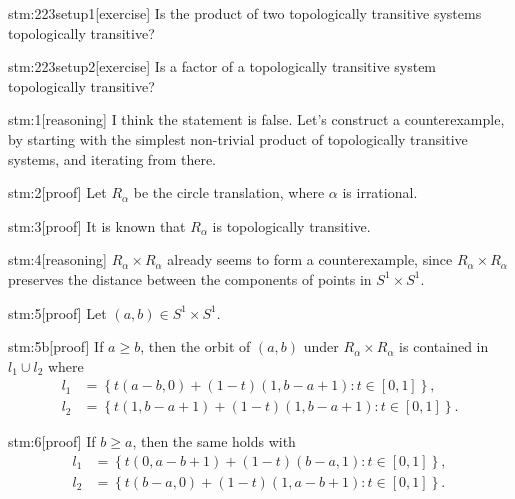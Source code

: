 
\begin{stm}{stm:223setup1}[exercise]
Is the product of two topologically transitive systems topologically transitive?
\end{stm}

\begin{stm}{stm:223setup2}[exercise]
Is a factor of a topologically transitive system topologically transitive?
\end{stm}


\begin{stm}{stm:1}[reasoning]
I think the statement is false. Let's construct a counterexample, by starting with the simplest non-trivial product of topologically transitive systems, and iterating from there.
\end{stm}

\begin{stm}{stm:2}[proof]
Let $R_\alpha$ be the circle translation, where $\alpha$ is irrational.
\end{stm}

\begin{stm}{stm:3}[proof]
It is known that $R_\alpha$ is topologically transitive.
\end{stm}

\begin{stm}{stm:4}[reasoning]
$R_\alpha \times R_\alpha$ already seems to form a counterexample, since $R_\alpha \times R_\alpha$ preserves the distance between the components of points in $S^1 \times S^1$.
\end{stm}

\begin{stm}{stm:5}[proof]
Let $(a,b) \in S^1 \times S^1$. 
\end{stm}

\begin{stm}{stm:5b}[proof]
If $a \geq b$, then the orbit of $(a,b)$ under $R_\alpha \times R_\alpha$ is contained in $l_1 \cup l_2$ where
\begin{align*}
l_1 &= \left\{ t(a-b,0) + (1 - t)(1, b-a+1) : t \in [0,1] \right\}, \\
l_2 &= \left\{ t(1, b-a+1) + (1 - t)(1, b-a+1) : t \in [0,1] \right\}.
\end{align*}
\end{stm}

\begin{stm}{stm:6}[proof]
If $b \geq a$, then the same holds with
\begin{align*}
l_1 &= \left\{ t(0, a-b+1) + (1 - t)(b - a, 1) : t \in [0,1] \right\}, \\
l_2 &= \left\{ t(b-a, 0) + (1 - t)(1, a-b+1) : t \in [0,1] \right\}.
\end{align*}
\end{stm}

